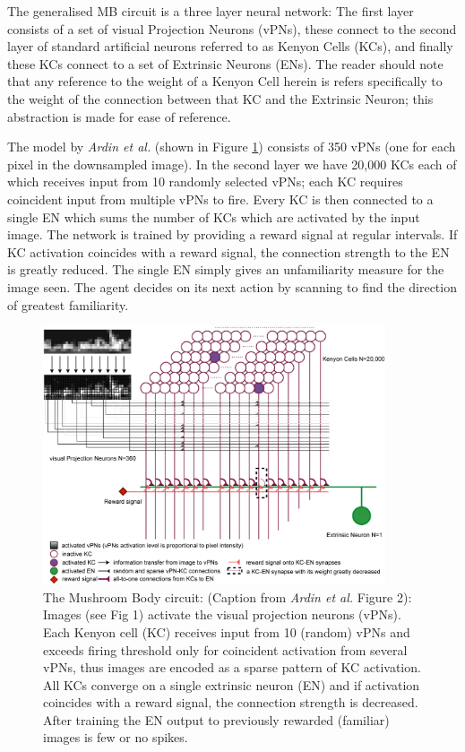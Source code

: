 \documentclass[a4paper,11pt,twoside,openright]{article}
\begin{document}
The generalised MB circuit is a three layer neural network: The first layer consists of a set of
visual Projection Neurons (vPNs), these connect to the second layer of standard artificial neurons
referred to as Kenyon Cells (KCs), and finally these KCs connect to a set of Extrinsic Neurons (ENs).
The reader should note that any reference to the weight of a Kenyon Cell herein is refers specifically
to the weight of the connection between that KC and the Extrinsic Neuron; this abstraction is made for
ease of reference.
\newline

The model by \textit{Ardin et al.} (shown in Figure \ref{fig:ardinmb}) consists of 350 vPNs
(one for each pixel in the downsampled image). In the second layer we have 20,000 KCs each of
which receives input from 10 randomly selected vPNs; each KC requires coincident input from multiple
vPNs to fire. Every KC is then connected to a single EN which sums the number of KCs which are
activated by the input image. The network is trained by providing a reward signal at regular
intervals. If KC activation coincides with a reward signal, the connection strength to the EN is
greatly reduced. The single EN simply gives an unfamiliarity measure for the image seen. The agent
decides on its next action by scanning to find the direction of greatest familiarity.
\newline

\begin{figure}
  \centering
  \includegraphics[width=0.9\textwidth]{Ardin2010MBModel}
  \caption{
    \label{fig:ardinmb} The Mushroom Body circuit: (Caption from \textit{Ardin et al.} Figure 2):
    Images (see Fig 1) activate the visual projection neurons (vPNs). Each Kenyon cell (KC) receives
    input from 10 (random) vPNs and exceeds firing threshold only for coincident activation from
    several vPNs, thus images are encoded as a sparse pattern of KC activation. All KCs converge on
    a single extrinsic neuron (EN) and if activation coincides with a reward signal, the connection
    strength is decreased. After training the EN output to previously rewarded (familiar) images is
    few or no spikes.
  }
\end{figure}
\end{document}
